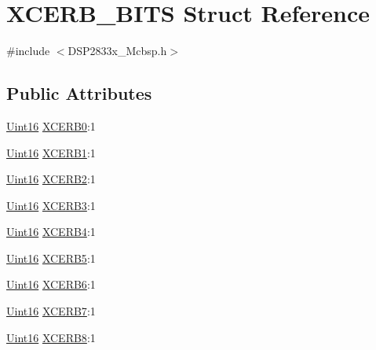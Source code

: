 \hypertarget{struct_x_c_e_r_b___b_i_t_s}{}\section{X\+C\+E\+R\+B\+\_\+\+B\+I\+T\+S Struct Reference}
\label{struct_x_c_e_r_b___b_i_t_s}


{\ttfamily \#include $<$D\+S\+P2833x\+\_\+\+Mcbsp.\+h$>$}

\subsection*{Public Attributes}
\begin{DoxyCompactItemize}
\item 
\hyperlink{_d_s_p2833x___device_8h_a59a9f6be4562c327cbfb4f7e8e18f08b}{Uint16} \hyperlink{struct_x_c_e_r_b___b_i_t_s_a2b90f87983f78cbcde96937f5b1d84c1}{X\+C\+E\+R\+B0}\+:1
\item 
\hyperlink{_d_s_p2833x___device_8h_a59a9f6be4562c327cbfb4f7e8e18f08b}{Uint16} \hyperlink{struct_x_c_e_r_b___b_i_t_s_a1171855f5cbdf112cc7917d76bb49934}{X\+C\+E\+R\+B1}\+:1
\item 
\hyperlink{_d_s_p2833x___device_8h_a59a9f6be4562c327cbfb4f7e8e18f08b}{Uint16} \hyperlink{struct_x_c_e_r_b___b_i_t_s_a8d42c669d9241ca0c6b1c8c922964713}{X\+C\+E\+R\+B2}\+:1
\item 
\hyperlink{_d_s_p2833x___device_8h_a59a9f6be4562c327cbfb4f7e8e18f08b}{Uint16} \hyperlink{struct_x_c_e_r_b___b_i_t_s_ac8d4c1310054f85b442fd2ec251c3a18}{X\+C\+E\+R\+B3}\+:1
\item 
\hyperlink{_d_s_p2833x___device_8h_a59a9f6be4562c327cbfb4f7e8e18f08b}{Uint16} \hyperlink{struct_x_c_e_r_b___b_i_t_s_acbd35822a00c6bfbe0b38544fcfd8147}{X\+C\+E\+R\+B4}\+:1
\item 
\hyperlink{_d_s_p2833x___device_8h_a59a9f6be4562c327cbfb4f7e8e18f08b}{Uint16} \hyperlink{struct_x_c_e_r_b___b_i_t_s_a05b4ade997c6414186c461310d44f055}{X\+C\+E\+R\+B5}\+:1
\item 
\hyperlink{_d_s_p2833x___device_8h_a59a9f6be4562c327cbfb4f7e8e18f08b}{Uint16} \hyperlink{struct_x_c_e_r_b___b_i_t_s_a56568d3403db515113113c040b2b5ed2}{X\+C\+E\+R\+B6}\+:1
\item 
\hyperlink{_d_s_p2833x___device_8h_a59a9f6be4562c327cbfb4f7e8e18f08b}{Uint16} \hyperlink{struct_x_c_e_r_b___b_i_t_s_a52f60f71d6b8d3150c2198c8333f8282}{X\+C\+E\+R\+B7}\+:1
\item 
\hyperlink{_d_s_p2833x___device_8h_a59a9f6be4562c327cbfb4f7e8e18f08b}{Uint16} \hyperlink{struct_x_c_e_r_b___b_i_t_s_ab40f91b1c91a65f279b39036a5151668}{X\+C\+E\+R\+B8}\+:1

\end{DoxyCompactItemize}

